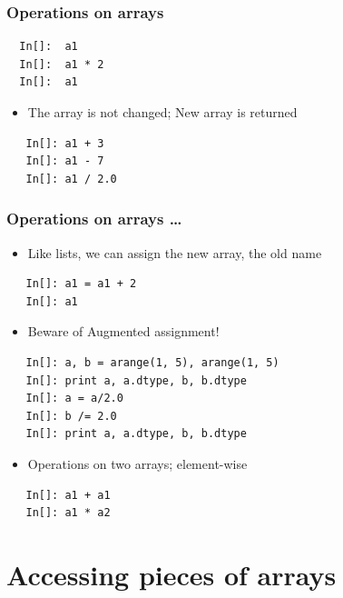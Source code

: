 \begin{frame}[fragile]
  \frametitle{Operations on arrays}
  \begin{lstlisting}
  In[]:  a1
  In[]:  a1 * 2
  In[]:  a1
  \end{lstlisting}
  \begin{itemize}
  \item The array is not changed; New array is returned
  \end{itemize}
  \begin{lstlisting}
   In[]: a1 + 3
   In[]: a1 - 7
   In[]: a1 / 2.0
  \end{lstlisting}
\end{frame}

\begin{frame}[fragile]
  \frametitle{Operations on arrays \ldots}
  \begin{itemize}
  \item Like lists, we can assign the new array, the old name
  \end{itemize}
  \begin{lstlisting}
   In[]: a1 = a1 + 2
   In[]: a1
  \end{lstlisting}
  \begin{itemize}
   \item \alert{Beware of Augmented assignment!}
  \end{itemize}
  \begin{lstlisting}
   In[]: a, b = arange(1, 5), arange(1, 5)
   In[]: print a, a.dtype, b, b.dtype
   In[]: a = a/2.0
   In[]: b /= 2.0
   In[]: print a, a.dtype, b, b.dtype
  \end{lstlisting}
  \begin{itemize}
  \item Operations on two arrays; element-wise
  \end{itemize}
  \begin{lstlisting}
   In[]: a1 + a1
   In[]: a1 * a2
  \end{lstlisting}
\end{frame}

\section{Accessing pieces of arrays}


